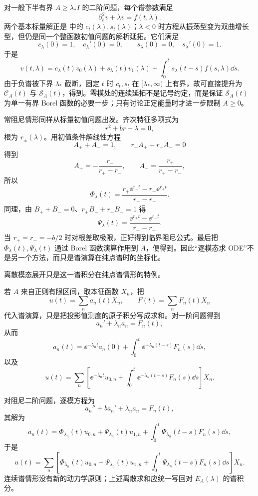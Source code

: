 对一般下半有界 $A\ge\lambda_*I$ 的二阶问题，每个谱参数满足
\[
 \partial_t^2v+\lambda v=f(t,\lambda).
\]
两个基本标量解正是 中的 $c_t(\lambda),s_t(\lambda)$；$\lambda<0$ 时方程从振荡型变为双曲增长型，但仍是同一个整函数初值问题的解析延拓。它们满足
\[
 c_\lambda(0)=1,
 \quad c_\lambda'(0)=0,
 \qquad
 s_\lambda(0)=0,
 \quad s_\lambda'(0)=1.
\]
于是
\[
 v(t,\lambda)=c_\lambda(t)v_0(\lambda)
 +s_\lambda(t)v_1(\lambda)
 +\int_0^ts_\lambda(t-s)f(s,\lambda)\dd s.
\]
由于负谱被下界 $\lambda_*$ 截断，固定 $t$ 时 $c_t,s_t$ 在 $[\lambda_*,\infty)$ 上有界，故可直接提升为 $\mathcal C_A(t)$ 与 $\mathcal S_A(t)$，得到。零模处的连续延拓不是记号约定，而是保证 $\mathcal S_A(t)$ 为单一有界 Borel 函数的必要一步；只有讨论正定能量时才进一步限制 $A\ge0$。

常阻尼情形同样从标量初值问题出发。齐次特征多项式为
\[
 r^2+br+\lambda=0,
\]
根为 $r_\pm(\lambda)$。用初值条件解线性方程
\[
 A_++A_-=1,
 \qquad
 r_+A_++r_-A_-=0
\]
得到
\[
 A_+=-\frac{r_-}{r_+-r_-},
 \qquad
 A_-=\frac{r_+}{r_+-r_-},
\]
所以
\[
 \Phi_\lambda(t)
 =\frac{r_+\ee^{r_-t}-r_-\ee^{r_+t}}{r_+-r_-}.
\]
同理，由 $B_++B_-=0$、$r_+B_++r_-B_-=1$ 得
\[
 \Psi_\lambda(t)
 =\frac{\ee^{r_+t}-\ee^{r_-t}}{r_+-r_-}.
\]
当 $r_+=r_-=-b/2$ 时对根差取极限，正好得到临界阻尼公式。最后把 $\Phi_\lambda(t),\Psi_\lambda(t)$ 通过 Borel 函数演算作用到 $A$，便得到。因此“逐模态求 ODE”不是另一个方法，而只是谱演算在纯点谱时的坐标化。

离散模态展开只是这一谱积分在纯点谱情形的特例。

若 $A$ 来自正则有限区间，取本征函数 $X_n$，把
\begin{equation*}u(t)=\sum_n a_n(t)X_n,
 \qquad
 F(t)=\sum_nF_n(t)X_n
\end{equation*}
代入谱演算，只是把投影值测度的原子积分写成求和。对一阶问题得到
\begin{equation*}a_n'+\lambda_n a_n=F_n(t),
\end{equation*}
从而
\begin{equation*}a_n(t)=\ee^{-\lambda_n t}a_n(0)
 +\int_0^t\ee^{-\lambda_n(t-s)}F_n(s)\dd s,
\end{equation*}
以及
\begin{equation*}u(t)=\sum_n
 \left[\ee^{-\lambda_n t}u_{0,n}
 +\int_0^t\ee^{-\lambda_n(t-s)}F_n(s)\dd s\right]X_n.
\end{equation*}

对阻尼二阶问题，逐模方程为
\begin{equation*}a_n''+ba_n'+\lambda_n a_n=F_n(t),
\end{equation*}
其解为
\begin{equation*}a_n(t)=\Phi_{\lambda_n}(t)u_{0,n}
 +\Psi_{\lambda_n}(t)u_{1,n}
 +\int_0^t\Psi_{\lambda_n}(t-s)F_n(s)\dd s,
\end{equation*}
于是
\begin{equation*}u(t)=\sum_n
 \left[\Phi_{\lambda_n}(t)u_{0,n}
 +\Psi_{\lambda_n}(t)u_{1,n}
 +\int_0^t\Psi_{\lambda_n}(t-s)F_n(s)\dd s\right]X_n.
\end{equation*}
连续谱情形没有新的动力学原则；上述离散求和应统一写回对 $E_A(\lambda)$ 的谱积分。

